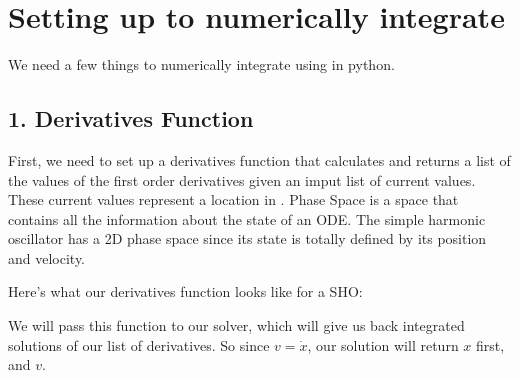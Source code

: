 \documentclass[letterpaper,10pt,english]{jupyterBook}
\begin{document}
\section{Setting up to numerically integrate}
\label{\detokenize{content/1_mechanics/lagrange_2:setting-up-to-numerically-integrate}}
\sphinxAtStartPar
We need a few things to numerically integrate using  in python.


\subsection{1. Derivatives Function}
\label{\detokenize{content/1_mechanics/lagrange_2:derivatives-function}}
\sphinxAtStartPar
First, we need to set up a derivatives function that calculates and returns a list of the values of the first order derivatives given an imput list of current values. These current values represent a location in . Phase Space is a space that contains all the information about the state of an ODE. The simple harmonic oscillator has a 2D phase space since its state is totally defined by its position and velocity.

\sphinxAtStartPar
Here’s what our derivatives function looks like for a SHO:

\begin{sphinxVerbatim}[commandchars=\\\{\}]
  
          
    
         

      
\end{sphinxVerbatim}

\sphinxAtStartPar
We will pass this function to our solver, which will give us back integrated solutions of our list of derivatives. So since \(v = \dot{x}\), our solution will return \(x\) first, and \(v\).
\end{document}
